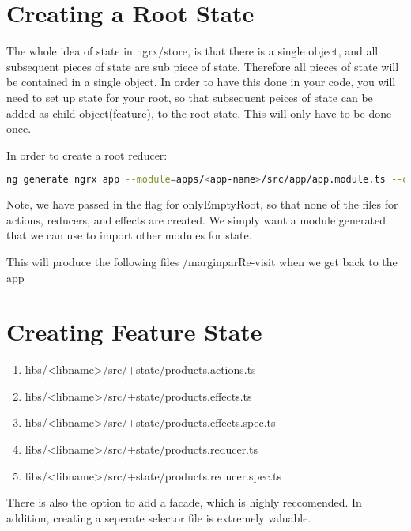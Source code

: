 \section{Creating a Root State}

The whole idea of state in ngrx/store, is that there is a single object, and
all subsequent pieces of state are sub piece of state. Therefore all pieces of
state will be contained in a single object. In order to have this done in your
code, you will need to set up state for your root, so that subsequent peices of
state can be added as child object(feature), to the root state. This will only
have to be done once.

In order to create a root reducer:
\begin{lstlisting}[language=Bash]
  ng generate ngrx app --module=apps/<app-name>/src/app/app.module.ts --onlyEmptyRoot
\end{lstlisting}

Note, we have passed in the flag for onlyEmptyRoot, so that none of the files
for actions, reducers, and effects are created. We simply want a module
generated that we can use to import other modules for state.

This will produce the following files /marginpar{Re-visit when we get back to
the app}

\section{Creating Feature State}


\begin{enumerate}
  \item libs/<libname>/src/+state/products.actions.ts
  \item libs/<libname>/src/+state/products.effects.ts
  \item libs/<libname>/src/+state/products.effects.spec.ts
  \item libs/<libname>/src/+state/products.reducer.ts
  \item libs/<libname>/src/+state/products.reducer.spec.ts
\end{enumerate}

There is also the option to add a facade, which is highly reccomended. In
addition, creating a seperate selector file is extremely valuable.
